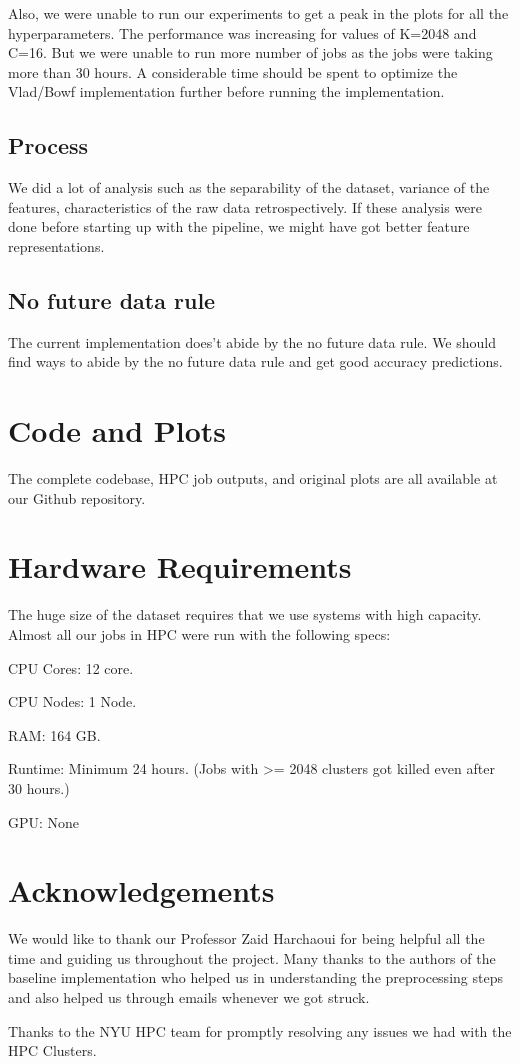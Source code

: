 \documentclass[final,leqno,onefignum,onetabnum]{siamltexmm}
\begin{document}
Also, we were unable to run our experiments to get a peak in the plots for all the hyperparameters.  
The performance was increasing for values of K=2048 and C=16.  
But we were unable to run more number of jobs as the jobs were taking more than 30 hours.  
A considerable time should be spent to optimize the Vlad/Bowf implementation further before running the implementation.


\subsection{Process}
We did a lot of analysis such as the separability of the dataset, variance of the features, characteristics of the raw data retrospectively.  If these analysis were done before starting up with the pipeline, we might have got better feature representations.

\subsection{No future data rule}
The current implementation does't abide by the no future data rule.  We should find ways to abide by the no future data rule and get good accuracy predictions.


\section{Code and Plots}
The complete codebase, HPC job outputs, and original plots are all available at our Github repository.\cite{repo:github}

\section{Hardware Requirements}
The huge size of the dataset requires that we use systems with high capacity.  Almost all our jobs in HPC were run with the following specs:
\begin{description}
  \item{CPU Cores:}  12 core.
  \item{CPU Nodes:}  1 Node.
  \item{RAM:}  164 GB\@.
  \item{Runtime:} Minimum 24 hours.  (Jobs with >= 2048 clusters got killed even after 30 hours.)
  \item{GPU:} None
\end{description}

\section{Acknowledgements}
We would like to thank our Professor Zaid Harchaoui for being helpful all the time and guiding us throughout the project. 
Many thanks to the authors of the baseline implementation who helped us in understanding the preprocessing steps and also helped us through emails
whenever we got struck.

Thanks to the NYU HPC team for promptly resolving any issues we had with the HPC Clusters.

\newpage



\end{document}
